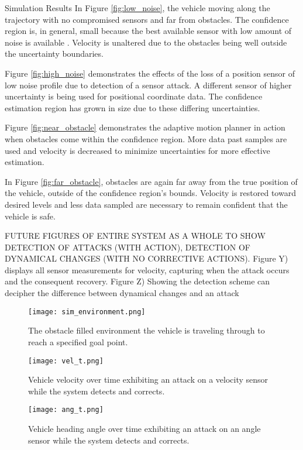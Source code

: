\begin{section}{Simulation Results}
In Figure \ref{fig:low_noise}, the vehicle moving along the trajectory with no compromised sensors and far from obstacles. The confidence region is, in general, small because the best available sensor with low amount of noise is available . Velocity is unaltered due to the obstacles being well outside the uncertainty boundaries.

Figure \ref{fig:high_noise} demonstrates the effects of the loss of a position sensor of low noise profile due to detection of a sensor attack. A different sensor of higher uncertainty is being used for positional coordinate data. The confidence estimation region has grown in size due to these differing uncertainties.

Figure \ref{fig:near_obstacle} demonstrates the adaptive motion planner in action when obstacles come within the confidence region. More data past samples are used and velocity is decreased to minimize uncertainties for more effective estimation.

In Figure \ref{fig:far_obstacle}, obstacles are again far away from the true position of the vehicle, outside of the confidence region's bounds. Velocity is restored toward desired levels and less data sampled are necessary to remain confident that the vehicle is safe.


FUTURE FIGURES OF ENTIRE SYSTEM AS A WHOLE TO SHOW DETECTION OF ATTACKS (WITH ACTION), DETECTION OF DYNAMICAL CHANGES (WITH NO CORRECTIVE ACTIONS).
Figure Y) displays all sensor measurements for velocity, capturing when the attack occurs and the consequent recovery. 
Figure Z) Showing the detection scheme can decipher the difference between dynamical changes and an attack


\begin{figure}
\vspace{1pt}
\centering
\texttt{[image: sim\_environment.png]}
\caption{The obstacle filled environment the vehicle is traveling through to reach a specified goal point.}
\label{fig:sim_env}
\end{figure}

\begin{figure}
\vspace{1pt}
\centering
\texttt{[image: vel\_t.png]}
\caption{Vehicle velocity over time exhibiting an attack on a velocity sensor while the system detects and corrects.}
\label{fig:vel_t}
\end{figure}

\begin{figure}
\vspace{1pt}
\centering
\texttt{[image: ang\_t.png]}
\caption{Vehicle heading angle over time exhibiting an attack on an angle sensor while the system detects and corrects.}
\label{fig:ang_t}
\end{figure}

\end{section}